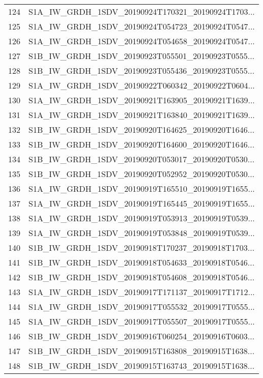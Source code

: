 \begin{tabular}{ll}
124 &  S1A\_IW\_GRDH\_1SDV\_20190924T170321\_20190924T1703... \\
125 &  S1A\_IW\_GRDH\_1SDV\_20190924T054723\_20190924T0547... \\
126 &  S1A\_IW\_GRDH\_1SDV\_20190924T054658\_20190924T0547... \\
127 &  S1B\_IW\_GRDH\_1SDV\_20190923T055501\_20190923T0555... \\
128 &  S1B\_IW\_GRDH\_1SDV\_20190923T055436\_20190923T0555... \\
129 &  S1A\_IW\_GRDH\_1SDV\_20190922T060342\_20190922T0604... \\
130 &  S1A\_IW\_GRDH\_1SDV\_20190921T163905\_20190921T1639... \\
131 &  S1A\_IW\_GRDH\_1SDV\_20190921T163840\_20190921T1639... \\
132 &  S1B\_IW\_GRDH\_1SDV\_20190920T164625\_20190920T1646... \\
133 &  S1B\_IW\_GRDH\_1SDV\_20190920T164600\_20190920T1646... \\
134 &  S1B\_IW\_GRDH\_1SDV\_20190920T053017\_20190920T0530... \\
135 &  S1B\_IW\_GRDH\_1SDV\_20190920T052952\_20190920T0530... \\
136 &  S1A\_IW\_GRDH\_1SDV\_20190919T165510\_20190919T1655... \\
137 &  S1A\_IW\_GRDH\_1SDV\_20190919T165445\_20190919T1655... \\
138 &  S1A\_IW\_GRDH\_1SDV\_20190919T053913\_20190919T0539... \\
139 &  S1A\_IW\_GRDH\_1SDV\_20190919T053848\_20190919T0539... \\
140 &  S1B\_IW\_GRDH\_1SDV\_20190918T170237\_20190918T1703... \\
141 &  S1B\_IW\_GRDH\_1SDV\_20190918T054633\_20190918T0546... \\
142 &  S1B\_IW\_GRDH\_1SDV\_20190918T054608\_20190918T0546... \\
143 &  S1A\_IW\_GRDH\_1SDV\_20190917T171137\_20190917T1712... \\
144 &  S1A\_IW\_GRDH\_1SDV\_20190917T055532\_20190917T0555... \\
145 &  S1A\_IW\_GRDH\_1SDV\_20190917T055507\_20190917T0555... \\
146 &  S1B\_IW\_GRDH\_1SDV\_20190916T060254\_20190916T0603... \\
147 &  S1B\_IW\_GRDH\_1SDV\_20190915T163808\_20190915T1638... \\
148 &  S1B\_IW\_GRDH\_1SDV\_20190915T163743\_20190915T1638... \\

\end{tabular}
